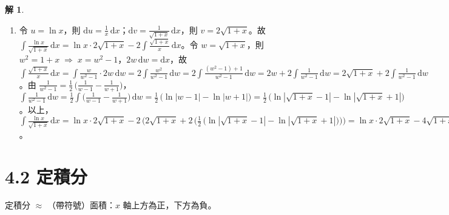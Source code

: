 \documentclass[12pt]{extarticle}
\newcommand{\ds}{\displaystyle}
\newcommand{\ie}{\;\Longrightarrow\;}
\theoremstyle{definition}
\newtheorem*{sol}{解}
\newcommand{\myline}{\noindent\makebox[\linewidth]{\rule{\paperwidth}{0.4pt}}}
\begin{document}
\begin{sol}
\begin{enumerate}
  \item 令 $\ds u = \ln x$，則 $\ds\text{d}u = \frac{1}{x}\,\text{d}x$；$\ds\text{d}v = \frac{1}{\sqrt{1 + x}}\,\text{d}x$，則 $\ds v = 2\sqrt{1 + x}$。故 $\ds\int\!\frac{\ln x}{\sqrt{1 + x}}\,\text{d}x = \ln x\cdot 2\sqrt{1 + x} - 2 \int\!\frac{\sqrt{1 + x}}{x}\,\text{d}x$。令 $\ds w = \sqrt{1 + x}$，則 $\ds w^2 = 1 + x \ie x= w^2 - 1$，$\ds 2w\,\text{d}w = \text{d}x$，故 $\ds\int\!\frac{\sqrt{1 + x}}{x}\,\text{d}x = \int\!\frac{w}{w^2 - 1}\cdot 2w\,\text{d}w = 2\int\!\frac{w^2}{w^2 - 1}\,\text{d}w = 2\int\!\frac{(w^2 - 1) + 1}{w^2 - 1}\,\text{d}w = 2 w + 2\int\!\frac{1}{w^2 - 1}\,\text{d}w = 2\sqrt{1 + x} + 2\int\!\frac{1}{w^2 -1}\,\text{d}w$。由 $\ds\frac{1}{w^2 - 1} = \frac{1}{2}\,\bigg(\frac{1}{w - 1} - \frac{1}{w + 1}\bigg)$，$\ds\int\!\frac{1}{w^2 - 1}\,\text{d}w = \frac{1}{2}\int\!\Big(\frac{1}{w - 1} - \frac{1}{w + 1}\Big)\,\text{d}w =\frac{1}{2}\,\big(\ln|w - 1| - \ln|w + 1|\big) = \frac{1}{2}\,\big(\ln|\sqrt{1 + x} - 1| - \ln|\sqrt{1 + x} + 1|\big)$。以上，$\ds\int\!\frac{\ln x}{\sqrt{1 + x}}\,\mathrm{d}x = \ln x\cdot 2\sqrt{1 + x} - 2\,\big(2\sqrt{1+x} + 2\,\big(\frac{1}{2}\,\big(\ln|\sqrt{1 + x} - 1| - \ln|\sqrt{1 + x} + 1|\big)\big)\big) = \ln x\cdot 2\sqrt{1 + x} - 4\sqrt{1 + x} - 2\ln|\sqrt{1 + x} - 1| + 2\ln|\sqrt{1 + x} + 1| + c$。
  \end{enumerate}
\end{sol}

\myline

\newpage
\section*{4.2 定積分}

定積分 $\approx$ （帶符號）面積：$x$ 軸上方為正，下方為負。
\end{document}
